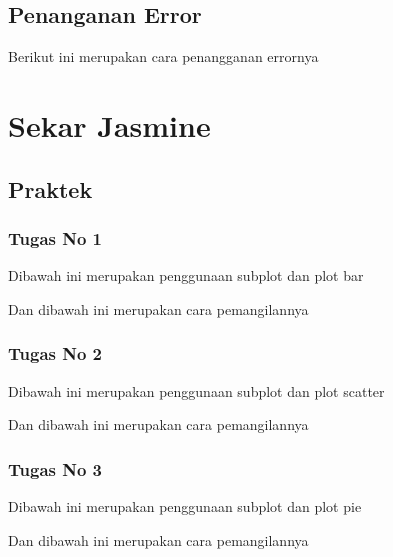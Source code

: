\subsection{Penanganan Error}

\hfill \break

Berikut ini merupakan cara penangganan errornya

\section{Sekar Jasmine}
\subsection{Praktek}
\subsubsection{Tugas No 1}
\hfill \break
Dibawah ini merupakan penggunaan subplot dan plot bar

Dan dibawah ini merupakan cara pemangilannya



\subsubsection{Tugas No 2}

\hfill \break

Dibawah ini merupakan penggunaan subplot dan plot scatter

Dan dibawah ini merupakan cara pemangilannya



\subsubsection{Tugas No 3}

\hfill \break

Dibawah ini merupakan penggunaan subplot dan plot pie

Dan dibawah ini merupakan cara pemangilannya



